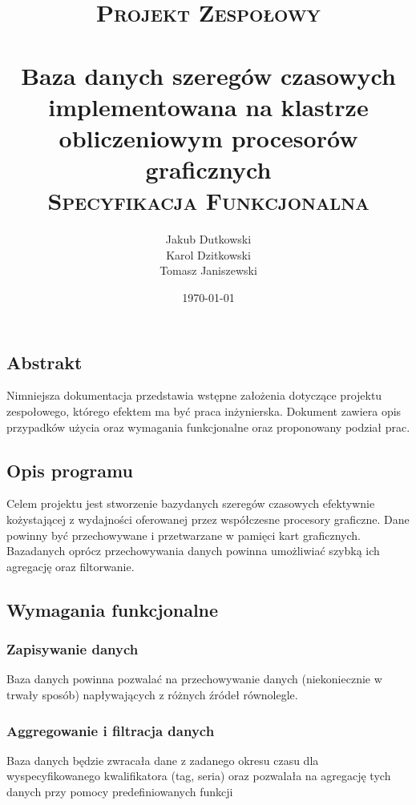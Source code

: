 \documentclass[paper=a4, fontsize=11pt]{scrartcl} %
\title{
\vspace*{\fill}
\normalfont
\textsc{Projekt Zespołowy}\\ [20pt]
\horrule{1.5pt} \\[0.4cm] %
\LARGE Baza danych szeregów czasowych implementowana na klastrze obliczeniowym procesorów graficznych
\horrule{1.5pt} \\[0.1cm] %
\normalsize
\textsc{Specyfikacja Funkcjonalna} \\ [20pt]
\vspace*{\fill}
}
\author{Jakub Dutkowski \\ Karol Dzitkowski \\ Tomasz Janiszewski } %
\date{\normalsize\today} %
\numberwithin{equation}{section} %
\numberwithin{figure}{section} %
\numberwithin{table}{section} %
\begin{document}
\maketitle

\thispagestyle{empty}
\clearpage

\tableofcontents
\listoffigures

\chapter{}

\clearpage

\vspace{4em}


\section{Abstrakt}
Nimniejsza dokumentacja przedstawia wstępne założenia dotyczące projektu zespołowego, którego efektem ma być praca inżynierska.
Dokument zawiera opis przypadków użycia oraz wymagania funkcjonalne oraz proponowany podział prac.

\section{Opis programu}
Celem projektu jest stworzenie bazydanych szeregów czasowych efektywnie kożystającej z wydajności oferowanej przez współczesne
procesory graficzne. Dane powinny być przechowywane i przetwarzane w pamięci kart graficznych. Bazadanych oprócz przechowywania
danych powinna umożliwiać szybką ich agregację oraz filtorwanie.

\section{Wymagania funkcjonalne}
    \subsection{Zapisywanie danych}
    Baza danych powinna pozwalać na przechowywanie danych (niekoniecznie w trwały sposób) napływających z różnych źródeł
    równolegle.
    \subsection{Aggregowanie i filtracja danych }
    Baza danych będzie zwracała dane z zadanego okresu czasu dla wyspecyfikowanego kwalifikatora (tag, seria) oraz pozwalała
    na agregację tych danych przy pomocy predefiniowanych funkcji
\end{document}
